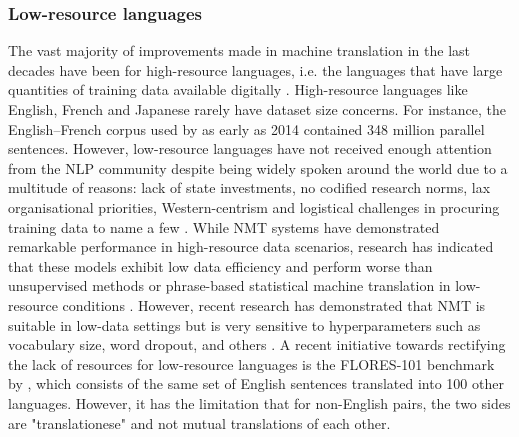 \documentclass[11pt]{article}
\begin{document}
\subsubsection*{Low-resource languages} \vspace{-2mm}
The vast majority of improvements made in machine translation in the last decades have been for high-resource languages, i.e. the languages that have large quantities of training data available digitally \citep{fan2021beyond}.
High-resource languages like English, French and Japanese rarely have dataset size concerns.
For instance, the English–French corpus used by \cite{cho-etal-2014-properties} as early as 2014 contained 348 million parallel sentences.
However, low-resource languages have not received enough attention from the NLP community despite being widely spoken around the world due to a multitude of reasons: lack of state investments, no codified research norms, lax organisational priorities, Western-centrism and logistical challenges in procuring training data to name a few \citep{costa2022no}.
While NMT systems have demonstrated remarkable performance in high-resource data scenarios, research has indicated that these models exhibit low data efficiency and perform worse than unsupervised methods or phrase-based statistical machine translation in low-resource conditions \citep{koehn-knowles-2017-six}.
However, recent research has demonstrated that NMT is suitable in low-data settings but is very sensitive to hyperparameters such as vocabulary size, word dropout, and others \citep{sennrich-zhang-2019-revisiting}.
A recent initiative towards rectifying the lack of resources for low-resource languages is the FLORES-101 benchmark by \cite{goyal2022flores}, which consists of the same set of English sentences translated into 100 other languages.
However, it has the limitation that for non-English pairs, the two sides are "translationese" and not mutual translations of each other. 
\end{document}
